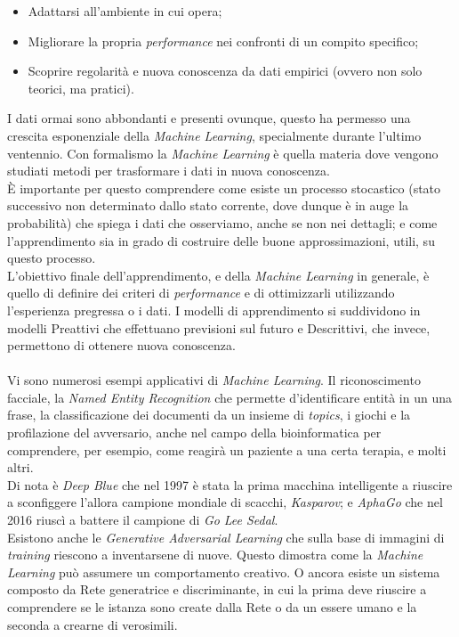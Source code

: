 \documentclass[10pt,a4paper]{book}
\begin{document}
\begin{itemize}
\item Adattarsi all'ambiente in cui opera;
\item Migliorare la propria \textit{performance} nei confronti di un compito specifico;
\item Scoprire regolarit\`a e nuova conoscenza da dati empirici (ovvero non solo teorici, ma pratici).
\end{itemize}
I dati ormai sono abbondanti e presenti ovunque, questo ha permesso una crescita esponenziale della \textit{Machine Learning}, specialmente durante l'ultimo ventennio. Con formalismo la \textit{Machine Learning} \`e quella materia dove vengono studiati metodi per trasformare i dati in nuova conoscenza.\\
\`E importante per questo comprendere come esiste un processo stocastico (stato successivo non determinato dallo stato corrente, dove dunque \`e in auge la probabilit\`a) che spiega i dati che osserviamo, anche se non nei dettagli; e come l'apprendimento sia in grado di costruire delle buone approssimazioni, utili, su questo processo.\\
L'obiettivo finale dell'apprendimento, e della \textit{Machine Learning} in generale, \`e quello di definire dei criteri di \textit{performance} e di ottimizzarli utilizzando l'esperienza pregressa o i dati. I modelli di apprendimento si suddividono in modelli Preattivi che effettuano previsioni sul futuro e Descrittivi, che invece, permettono di ottenere nuova conoscenza.\\\\
Vi sono numerosi esempi applicativi di \textit{Machine Learning}. Il riconoscimento facciale, la \textit{Named Entity Recognition} che permette d'identificare entit\`a in un una frase, la classificazione dei documenti da un insieme di \textit{topics}, i giochi e la profilazione del avversario, anche nel campo della bioinformatica per comprendere, per esempio, come reagir\`a un paziente a una certa terapia, e molti altri.\\
Di nota \`e \textit{Deep Blue} che nel 1997 \`e stata la prima macchina intelligente a riuscire a sconfiggere l'allora campione mondiale di scacchi, \textit{Kasparov}; e \textit{AphaGo} che nel 2016 riusc\`i a battere il campione di \textit{Go} \textit{Lee Sedal}.\\
Esistono anche le \textit{Generative Adversarial Learning} che sulla base di immagini di \textit{training} riescono a inventarsene di nuove. Questo dimostra come la \textit{Machine Learning} pu\`o assumere un comportamento creativo. O ancora esiste un sistema composto da Rete generatrice e discriminante, in cui la prima deve riuscire a comprendere se le istanza  sono create dalla Rete o da un essere umano e la seconda a crearne di verosimili.
\end{document}
